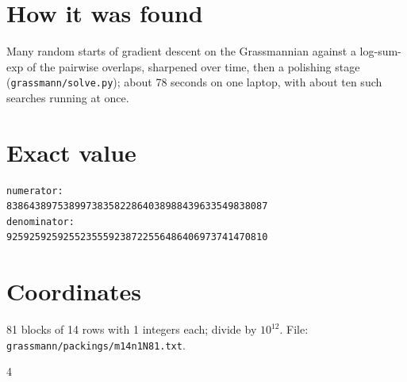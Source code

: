 \documentclass[11pt,a4paper]{article}
\begin{document}
\section{How it was found}
Many random starts of gradient descent on the Grassmannian against a log-sum-exp of the pairwise overlaps, sharpened over time, then a polishing stage (\texttt{grassmann/solve.py}); about 78 seconds on one laptop, with about ten such searches running at once.


\appendix
\section{Exact value}
{\small
\begin{verbatim}
numerator:
8386438975389973835822864038988439633549838087
denominator:
9259259259255235559238722556486406973741470810
\end{verbatim}}

\section{Coordinates}
81 blocks of 14 rows with 1 integers each; divide by $10^{12}$. File: \texttt{grassmann/packings/m14n1N81.txt}.
{\tiny
\begin{multicols}{4}
\end{multicols}}
\end{document}
